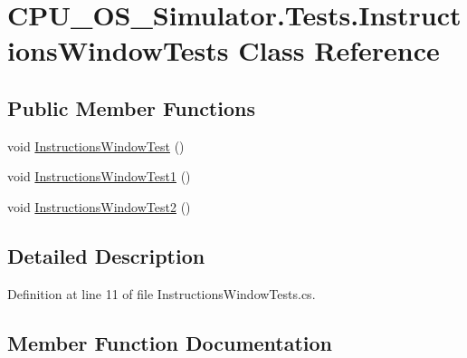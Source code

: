 \hypertarget{class_c_p_u___o_s___simulator_1_1_tests_1_1_instructions_window_tests}{}\section{C\+P\+U\+\_\+\+O\+S\+\_\+\+Simulator.\+Tests.\+Instructions\+Window\+Tests Class Reference}
\label{class_c_p_u___o_s___simulator_1_1_tests_1_1_instructions_window_tests}
\subsection*{Public Member Functions}
\begin{DoxyCompactItemize}
\item 
void \hyperlink{class_c_p_u___o_s___simulator_1_1_tests_1_1_instructions_window_tests_a2b346fb408ca259eae0f0ea8601329a2}{Instructions\+Window\+Test} ()
\item 
void \hyperlink{class_c_p_u___o_s___simulator_1_1_tests_1_1_instructions_window_tests_aeaf3021b4b5db5d689a153354defea18}{Instructions\+Window\+Test1} ()
\item 
void \hyperlink{class_c_p_u___o_s___simulator_1_1_tests_1_1_instructions_window_tests_ac2b4b0a184b5d0f43e817465f0b11217}{Instructions\+Window\+Test2} ()
\end{DoxyCompactItemize}


\subsection{Detailed Description}


Definition at line 11 of file Instructions\+Window\+Tests.\+cs.



\subsection{Member Function Documentation}
\hypertarget{class_c_p_u___o_s___simulator_1_1_tests_1_1_instructions_window_tests_a2b346fb408ca259eae0f0ea8601329a2}{}
